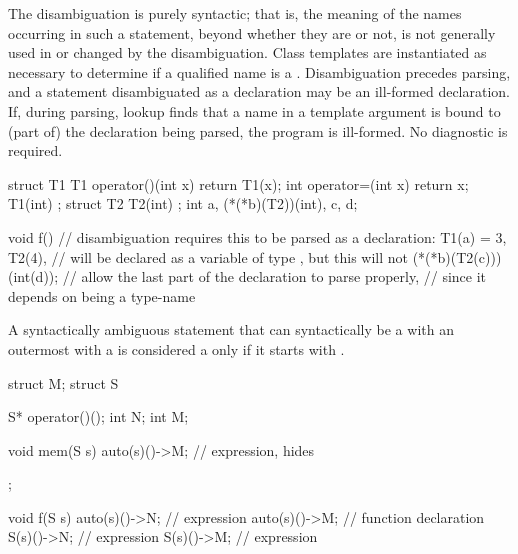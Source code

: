 \pnum
The disambiguation is purely syntactic; that is, the meaning of the
names occurring in such a statement, beyond whether they are
 or not, is not generally used in or changed by the
disambiguation. Class templates are instantiated as necessary to
determine if a qualified name is a . Disambiguation
precedes parsing, and a statement disambiguated as a declaration may be
an ill-formed declaration.
If, during parsing, lookup finds
that a name in a template argument is bound to
(part of) the declaration being parsed,
the program is ill-formed.
No diagnostic is required.
\begin{example}
\begin{codeblock}
struct T1 {
  T1 operator()(int x) { return T1(x); }
  int operator=(int x) { return x; }
  T1(int) { }
};
struct T2 { T2(int) { } };
int a, (*(*b)(T2))(int), c, d;

void f() {
  // disambiguation requires this to be parsed as a declaration:
  T1(a) = 3,
  T2(4),                        //  will be declared as a variable of type , but this will not
  (*(*b)(T2(c)))(int(d));       // allow the last part of the declaration to parse properly,
                                // since it depends on  being a type-name
}
\end{codeblock}
\end{example}

\pnum
A syntactically ambiguous statement that can syntactically be
a  with an outermost 
with a 
is considered a  only if it starts with .
\begin{example}
\begin{codeblock}
struct M;
struct S {
  S* operator()();
  int N;
  int M;

  void mem(S s) {
    auto(s)()->M;               // expression,  hides 
  }
};

void f(S s) {
  {
    auto(s)()->N;               // expression
    auto(s)()->M;               // function declaration
  }
  {
    S(s)()->N;                  // expression
    S(s)()->M;                  // expression
  }
}
\end{codeblock}
\end{example}
